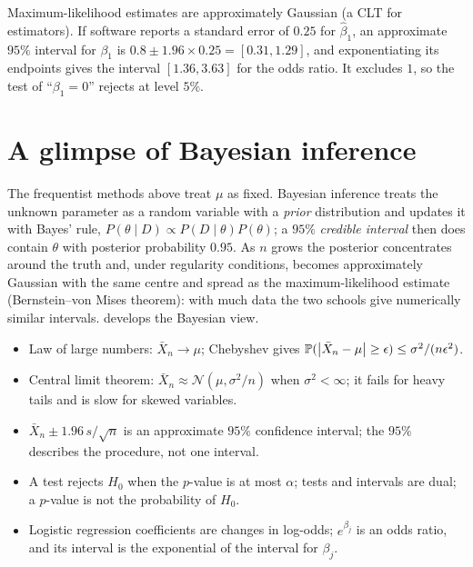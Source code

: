 \begin{notechapter}
\begin{example}
Maximum-likelihood estimates are approximately Gaussian (a CLT for estimators).
If software reports a standard error of $0.25$ for $\hat\beta_1$, an approximate
$95\%$ interval for $\beta_1$ is $0.8\pm1.96\times0.25 = [0.31, 1.29]$, and
exponentiating its endpoints gives the interval $[1.36, 3.63]$ for the odds
ratio. It excludes $1$, so the test of ``$\beta_1 = 0$'' rejects at level $5\%$.
\end{example}

\section{A glimpse of Bayesian inference}\label{lln-clt-inference:sec:bayes}

The frequentist methods above treat $\mu$ as fixed. Bayesian inference treats
the unknown parameter as a random variable with a \emph{prior} distribution and
updates it with Bayes' rule, $P(\theta\mid D)\propto P(D\mid\theta)P(\theta)$; a
$95\%$ \emph{credible interval} then does contain $\theta$ with posterior
probability $0.95$. As $n$ grows the posterior concentrates around the truth
and, under regularity conditions, becomes approximately Gaussian with the same
centre and spread as the maximum-likelihood estimate (Bernstein--von Mises
theorem): with much data the two schools give numerically similar intervals.
 develops the Bayesian view.

\begin{chaptersummary}
\begin{itemize}[nosep]
  \item Law of large numbers: $\bar X_n\to\mu$; Chebyshev gives
        $\mathbb{P}(\left|\bar X_n - \mu\right|\geq\epsilon)\leq\sigma^2/(n\epsilon^2)$.
  \item Central limit theorem: $\bar X_n\approx\mathcal N(\mu,\sigma^2/n)$ when
        $\sigma^2<\infty$; it fails for heavy tails and is slow for skewed
        variables.
  \item $\bar X_n\pm1.96\,s/\sqrt n$ is an approximate $95\%$ confidence
        interval; the $95\%$ describes the procedure, not one interval.
  \item A test rejects $H_0$ when the $p$-value is at most $\alpha$; tests and
        intervals are dual; a $p$-value is not the probability of $H_0$.
  \item Logistic regression coefficients are changes in log-odds; $e^{\beta_j}$
        is an odds ratio, and its interval is the exponential of the interval
        for $\beta_j$.
\end{itemize}
\end{chaptersummary}


\end{notechapter}

